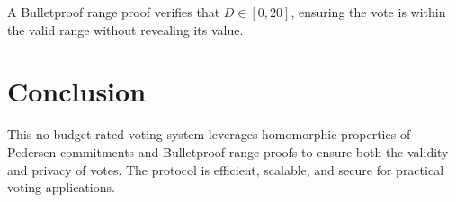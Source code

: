 \documentclass{article}
\begin{document}
A Bulletproof range proof verifies that \( D \in [0, 20] \), ensuring the vote is within the valid range without revealing its value.

\section{Conclusion}
This no-budget rated voting system leverages homomorphic properties of Pedersen commitments and Bulletproof range proofs to ensure both the validity and privacy of votes. The protocol is efficient, scalable, and secure for practical voting applications.
\end{document}
